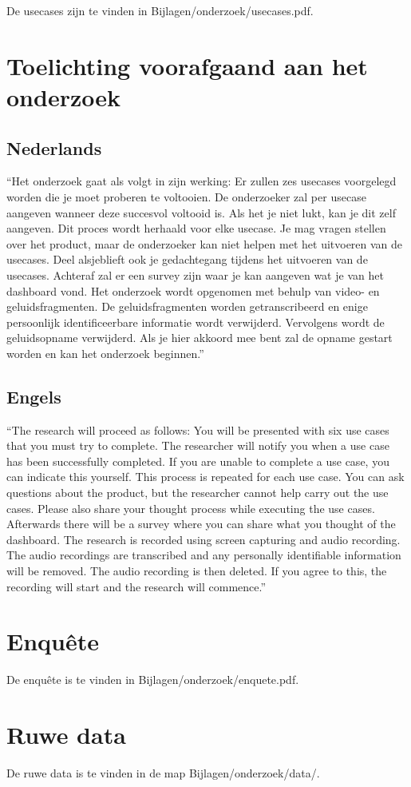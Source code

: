 \documentclass[a4paper, dutch]{article}
\begin{document}
De usecases zijn te vinden in Bijlagen/onderzoek/usecases.pdf.

\section{Toelichting voorafgaand aan het onderzoek}
\label{app:toelichting}

\subsection*{Nederlands} ``Het onderzoek gaat als volgt in zijn werking: Er zullen zes usecases voorgelegd worden die je moet proberen te voltooien. De onderzoeker zal per usecase aangeven wanneer deze succesvol voltooid is. Als het je niet lukt, kan je dit zelf aangeven. Dit proces wordt herhaald voor elke usecase. Je mag vragen stellen over het product, maar de onderzoeker kan niet helpen met het uitvoeren van de usecases. Deel alsjeblieft ook je gedachtegang tijdens het uitvoeren van de usecases. Achteraf zal er een survey zijn waar je kan aangeven wat je van het dashboard vond. Het onderzoek wordt opgenomen met behulp van video- en geluidsfragmenten. De geluidsfragmenten worden getranscribeerd en enige persoonlijk identificeerbare informatie wordt verwijderd. Vervolgens wordt de geluidsopname verwijderd. Als je hier akkoord mee bent zal de opname gestart worden en kan het onderzoek beginnen.''

\subsection*{Engels} ``The research will proceed as follows: You will be presented with six use cases that you must try to complete. The researcher will notify you when a use case has been successfully completed. If you are unable to complete a use case, you can indicate this yourself. This process is repeated for each use case. You can ask questions about the product, but the researcher cannot help carry out the use cases. Please also share your thought process while executing the use cases. Afterwards there will be a survey where you can share what you thought of the dashboard. The research is recorded using screen capturing and audio recording. The audio recordings are transcribed and any personally identifiable information will be removed. The audio recording is then deleted. If you agree to this, the recording will start and the research will commence.''

\section{Enquête}
\label{app:enquete}

De enquête is te vinden in Bijlagen/onderzoek/enquete.pdf.

\section{Ruwe data}
\label{app:results}

De ruwe data is te vinden in de map Bijlagen/onderzoek/data/.
\end{document}

